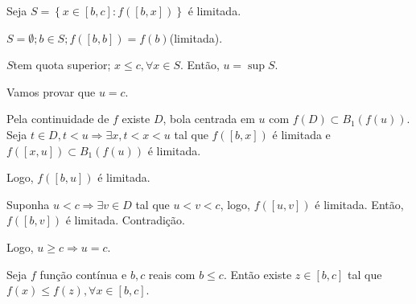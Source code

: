 \documentclass[11pt, oneside, a4paper]{gsm-l}
\begin{document}
\begin{dem}

Seja $S = \left\{ {x \in \left[ {b,c} \right]:f\left( {\left[ {b,x} \right]}
\right)} \right\}$ é limitada.

$S = \emptyset ;b \in S;f\left( {\left[ {b,b} \right]} \right) = f\left( b
\right)$(limitada).

$S$tem quota superior; $x \leqslant c,\forall x \in S$. Então, $u = \sup
S$.

Vamos provar que $u = c$.

Pela continuidade de $f$ existe $D$, bola centrada em $u$ com $f\left( D
\right) \subset B_1 \left( {f\left( u \right)} \right)$. Seja $t \in D,t <
u \Rightarrow \exists x,t < x < u$ tal que $f\left( {\left[ {b,x} \right]}
\right)$ é limitada e $f\left( {\left[ {x,u} \right]} \right) \subset
B_1 \left( {f\left( u \right)} \right)$ é limitada.

Logo, $f\left( {\left[ {b,u} \right]} \right)$ é limitada.

Suponha $u < c \Rightarrow \exists v \in D$ tal que $u < v < c$, logo,
$f\left( {\left[ {u,v} \right]} \right)$ é limitada. Então, $f\left(
{\left[ {b,v} \right]} \right)$ é limitada. Contradição.

Logo, $u \geqslant c \Rightarrow u = c$.

\end{dem}

\begin{teo}
\label{t2}

Seja $f$ função contínua e $b,c$ reais com $b \leqslant c$.
Então existe $z \in \left[ {b,c} \right]$ tal que $f\left( x \right)
\leqslant f\left( z \right),\forall x \in \left[ {b,c} \right]$.

\end{teo}
\end{document}
